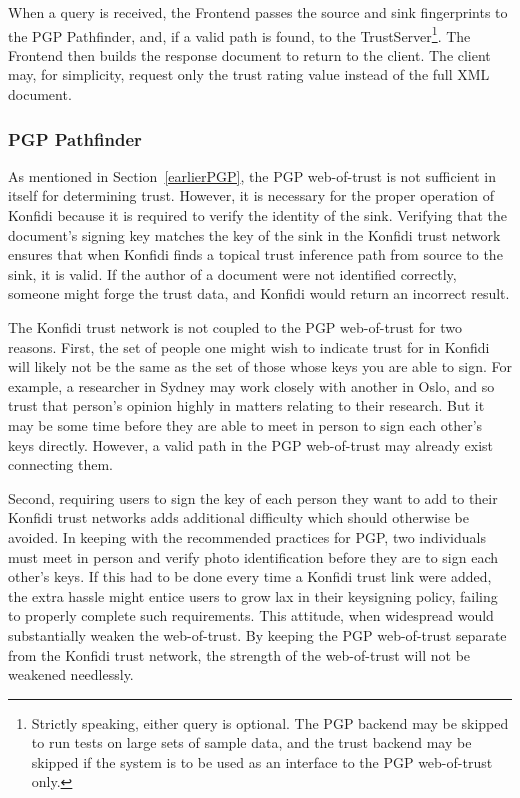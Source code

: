 \documentclass[letterpaper]{www2006-submission}
\begin{document}
When a query is received, the Frontend passes the source and sink fingerprints to the PGP Pathfinder, and, if a valid path is found, to the TrustServer\footnote{Strictly speaking, either query is optional.  The PGP backend may be skipped to run tests on large sets of sample data, and the trust backend may be skipped if the system is to be used as an interface to the PGP web-of-trust only.}.  The Frontend then builds the response document to return to the client.  The client may, for simplicity, request only the trust rating value instead of the full XML document.

\subsubsection{PGP Pathfinder}
As mentioned in Section~\ref{earlierPGP}, the PGP web-of-trust is not sufficient in itself for determining trust.  However, it is necessary for the proper operation of Konfidi because it is required to verify the identity of the sink.  Verifying that the document's signing key matches the key of the sink in the Konfidi trust network ensures that when Konfidi finds a topical trust inference path from source to the sink, it is valid.  If the author of a document were not identified correctly, someone might forge the trust data, and Konfidi would return an incorrect result. 

The Konfidi trust network is not coupled to the PGP web-of-trust for two reasons.  First, the set of people one might wish to indicate trust for in Konfidi will likely not be the same as the set of those whose keys you are able to sign.  For example, a researcher in Sydney may work closely with another in Oslo, and so trust that person's opinion highly in matters relating to their research.  But it may be some time before they are able to meet in person to sign each other's keys directly.  However, a valid path in the PGP web-of-trust may already exist connecting them.  

Second, requiring users to sign the key of each person they want to add to their Konfidi trust networks adds additional difficulty which should otherwise be avoided.  In keeping with the recommended practices for PGP, two individuals must meet in person and verify photo identification before they are to sign each other's keys.  If this had to be done every time a Konfidi trust link were added, the extra hassle might entice users to grow lax in their keysigning policy, failing to properly complete such requirements.  This attitude, when widespread would substantially weaken the web-of-trust.  By keeping the PGP web-of-trust separate from the Konfidi trust network, the strength of the web-of-trust will not be weakened needlessly.
\end{document}
